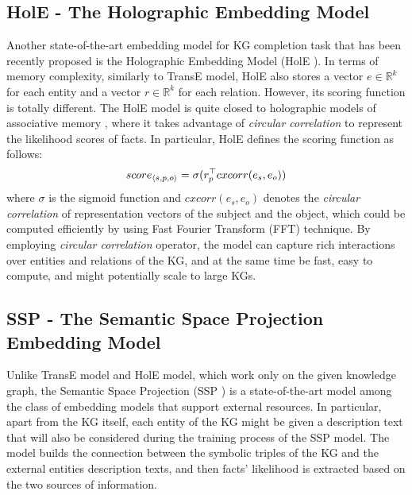 \subsection{HolE - The Holographic Embedding Model}
Another state-of-the-art embedding model for KG completion task that has been recently proposed is the Holographic Embedding Model (HolE \cite{DBLP:conf/aaai/NickelRP16}). In terms of memory complexity, similarly to TransE model, HolE also stores a vector $e \in \mathbb{R}^{k}$ for each entity and a vector $r \in \mathbb{R}^{k}$ for each relation. However, its scoring function is totally different. The HolE model is quite closed to holographic models of associative memory \cite{DBLP:conf/aaai/NickelRP16}, where it takes advantage of \textit{circular correlation} to represent the likelihood scores of facts. In particular, HolE defines the scoring function as follows:
 \begin{displaymath}
 score_{\langle s,p,o\rangle} = \sigma(r_p^\top cxcorr(e_s,e_o))
 \end{displaymath}
where $\sigma$ is the sigmoid function and $cxcorr(e_s,e_o)$ denotes the \textit{circular correlation} of representation vectors of the subject and the object, which could be computed efficiently by using Fast Fourier Transform (FFT) technique. By employing \textit{circular correlation} operator, the model can capture rich interactions over entities and relations of the KG, and at the same time be fast, easy to compute, and might potentially scale to large KGs.
\subsection{SSP - The Semantic Space Projection Embedding Model}
\label{related:ssp}
Unlike TransE model and HolE model, which work only on the given knowledge graph, the Semantic Space Projection (SSP \cite{DBLP:conf/aaai/0005HMZ17}) is a state-of-the-art model among the class of embedding models that support external resources. In particular, apart from the KG itself, each entity of the KG might be given a description text that will also be considered during the training process of the SSP model. The model builds the connection between the symbolic triples of the KG and the external entities description texts, and then facts' likelihood is extracted based on the two sources of information.

